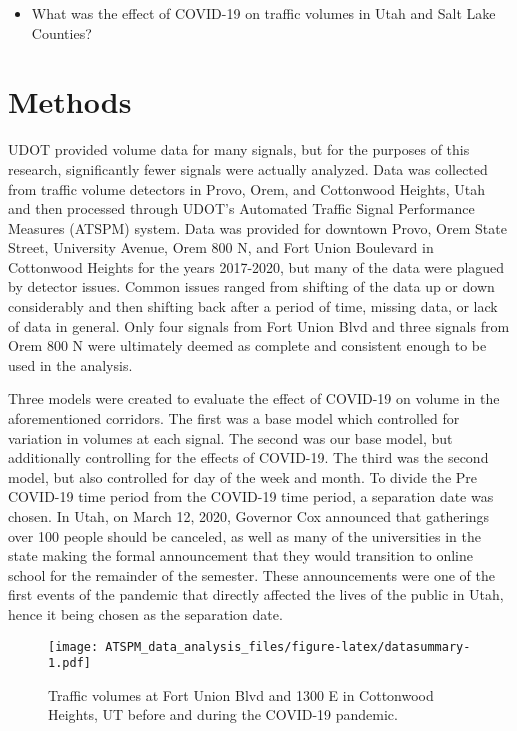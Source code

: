 \documentclass[3p, authoryear]{elsarticle} %
\providecommand{\tightlist}{%
  \setlength{\itemsep}{0pt}\setlength{\parskip}{0pt}}
\begin{document}
\begin{itemize}
\tightlist
\item
  What was the effect of COVID-19 on traffic volumes in Utah and Salt Lake Counties?
\end{itemize}

\hypertarget{methods}{%
\section{Methods}\label{methods}}

UDOT provided volume data for many signals, but for the purposes of this research, significantly fewer signals were actually analyzed. Data was collected from traffic volume detectors in Provo, Orem, and Cottonwood Heights, Utah and then processed through UDOT's Automated Traffic Signal Performance Measures (ATSPM) system. Data was provided for downtown Provo, Orem State Street, University Avenue, Orem 800 N, and Fort Union Boulevard in Cottonwood Heights for the years 2017-2020, but many of the data were plagued by detector issues. Common issues ranged from shifting of the data up or down considerably and then shifting back after a period of time, missing data, or lack of data in general. Only four signals from Fort Union Blvd and three signals from Orem 800 N were ultimately deemed as complete and consistent enough to be used in the analysis.

Three models were created to evaluate the effect of COVID-19 on volume in the aforementioned corridors. The first was a base model which controlled for variation in volumes at each signal. The second was our base model, but additionally controlling for the effects of COVID-19. The third was the second model, but also controlled for day of the week and month. To divide the Pre COVID-19 time period from the COVID-19 time period, a separation date was chosen. In Utah, on March 12, 2020, Governor Cox announced that gatherings over 100 people should be canceled, as well as many of the universities in the state making the formal announcement that they would transition to online school for the remainder of the semester. These announcements were one of the first events of the pandemic that directly affected the lives of the public in Utah, hence it being chosen as the separation date.

\begin{figure}
\centering
\texttt{[image: ATSPM\_data\_analysis\_files/figure-latex/datasummary-1.pdf]}
\caption{\label{fig:datasummary}Traffic volumes at Fort Union Blvd and 1300 E in Cottonwood Heights, UT before and during the COVID-19 pandemic.}
\end{figure}
\end{document}
